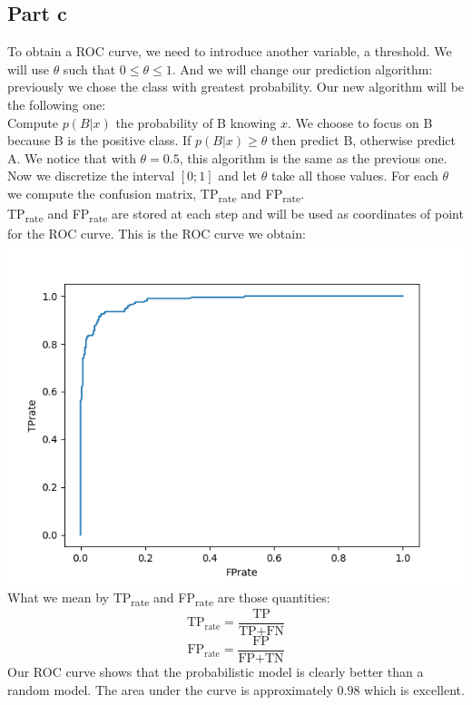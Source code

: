 \documentclass[a4paper, 10pt]{article}
\begin{document}
\subsection{Part c}
To obtain a ROC curve, we need to introduce another variable, a threshold. We will use
$\theta$ such that $0 \leq \theta \leq 1$. And we will change our prediction algorithm: previously
we chose the class with greatest probability. Our new algorithm will be the following one:
\\
Compute $p(B\vert x)$ the probability of B knowing $x$. We choose to focus on B because B is the positive class. 
If $p(B\vert x) \geq \theta$ then predict B, otherwise
predict A. We notice that with $\theta = 0.5$, this algorithm is the same as the previous one.
\\
Now we discretize the interval $[0;1]$ and let $\theta$ take all those values. For each $\theta$ we 
compute the confusion matrix, TP\textsubscript{rate} and FP\textsubscript{rate}.
\\
TP\textsubscript{rate} and FP\textsubscript{rate} are stored at each step and will be used as coordinates
of point for the ROC curve. This is the ROC curve we obtain:
\\
\includegraphics[scale=0.8]{ex2_roc}
\\
What we mean by TP\textsubscript{rate} and FP\textsubscript{rate} are those quantities:
$$
\text{TP}_\text{rate} = \frac{\text{TP}}{\text{TP}+\text{FN}}
$$
$$
\text{FP}_\text{rate} = \frac{\text{FP}}{\text{FP}+\text{TN}}
$$
Our ROC curve shows that the probabilistic model is clearly better than a random model.
The area under the curve is approximately $0.98$ which is excellent.
\end{document}
